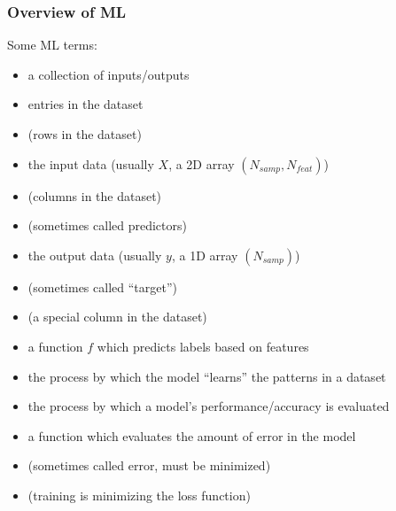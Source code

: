 \documentclass{beamer}
\begin{document}
\begin{frame}	
	\frametitle{Overview of ML}
	
	\begin{block}{Some ML terms:}
		\scriptsize
		\begin{itemize}[itemindent=4.0em]
			\item[Dataset:] a collection of inputs/outputs
			\item[Samples:] entries in the dataset
			\item[] (rows in the dataset)
			\item[Features:] the input data (usually $X$, a 2D array $(N_{samp},N_{feat})$)
			\item[] (columns in the dataset)
			\item[] (sometimes called predictors)
			\item[Labels:] the output data (usually $y$, a 1D array $(N_{samp})$) \\
			\item[] (sometimes called ``target'')
			\item[] (a special column in the dataset)
			\item[Model:] a function $f$ which predicts labels based on features
			\item[Training:] the process by which the model ``learns'' the patterns in a dataset
			\item[Testing:] the process by which a model's performance/accuracy is evaluated
			\item[Loss function:] a function which evaluates the amount of error in the model
			\item[] (sometimes called error, must be minimized)
			\item[] (training is minimizing the loss function)
		\end{itemize}
	\end{block}
	
\end{frame}
\end{document}
